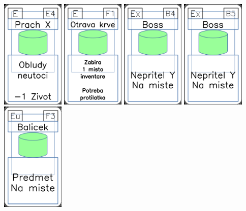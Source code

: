 \documentclass[a4paper]{article}
\begin{document}
	\includegraphics[width=3.0cm]{img-4_53}
	\includegraphics[width=3.0cm]{img-4_55}
	\includegraphics[width=3.0cm]{img-4_8}
	\includegraphics[width=3.0cm]{img-4_9}
	\includegraphics[width=3.0cm]{img-4_27}
\end{document}
